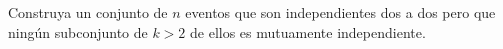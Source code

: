 \begin{statement}{4}
  Construya un conjunto de $n$ eventos que son independientes dos a dos pero que
  ning\'un subconjunto de $k > 2$ de ellos es mutuamente independiente.
\end{statement}